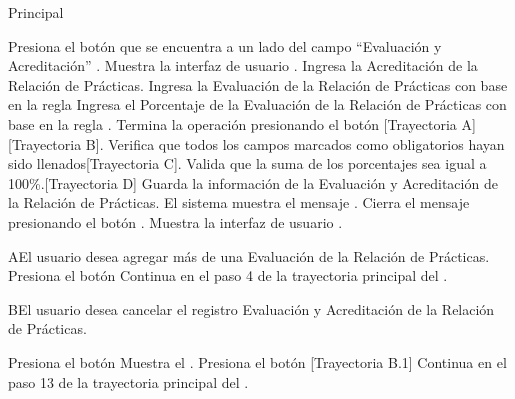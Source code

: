 \begin{UCtrayectoria}{Principal}

\UCpaso[\UCactor] Presiona el botón \BtnModal que se encuentra a un lado del campo ``Evaluación y Acreditación'' .
\UCpaso Muestra la interfaz de usuario .
\UCpaso[\UCactor] Ingresa la Acreditación de la Relación de Prácticas.
\UCpaso[\UCactor] Ingresa la Evaluación de la Relación de Prácticas con base en la regla 
\UCpaso[\UCactor] Ingresa el Porcentaje de la Evaluación de la Relación de Prácticas con base en la regla .
\UCpaso[\UCactor] Termina la operación presionando el botón  [Trayectoria A][Trayectoria B].
\UCpaso Verifica que todos los campos marcados como obligatorios hayan sido llenados[Trayectoria C].
\UCpaso Valida que la suma de los porcentajes sea igual a 100\%.[Trayectoria D]
\UCpaso Guarda la información de la Evaluación y Acreditación de la Relación de Prácticas.
\UCpaso El sistema muestra el mensaje .
\UCpaso[\UCactor] Cierra el mensaje presionando el botón . 
\UCpaso Muestra la interfaz de usuario  .
\end{UCtrayectoria}

\begin{UCtrayectoriaA}{A}{El usuario desea agregar más de una Evaluación de la Relación de Prácticas.}
\UCpaso[\UCactor] Presiona el botón 
\UCpaso Continua en el paso 4 de la trayectoria principal del .

\end{UCtrayectoriaA}

\begin{UCtrayectoriaA}{B}{El usuario desea cancelar el registro Evaluación y Acreditación de la Relación de Prácticas.}

\UCpaso[\UCactor] Presiona el botón 
\UCpaso Muestra el .
\UCpaso[\UCactor] Presiona el botón  [Trayectoria B.1]
\UCpaso Continua en el paso 13 de la trayectoria principal del .

\end{UCtrayectoriaA}

